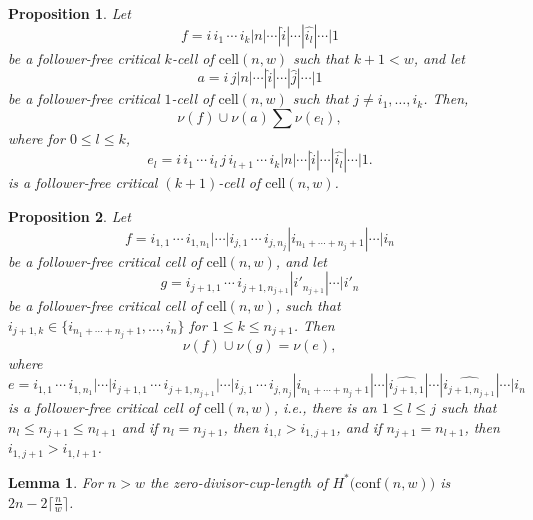 \documentclass[10pt,a4paper]{amsart}
\newtheorem{prop}{Proposition}
\newtheorem{lem}{Lemma}
\begin{document}
\begin{prop}\label{product of critical cells with same first element is a sum of critical cells with the same first element}
Let
\[
f=i\, i_{1}\, \cdots\, i_{k}|n|\cdots|\widehat{i}|\cdots|\widehat{i_{l}}|\cdots|1
\]
be a follower-free critical $k$-cell of $\text{cell}(n,w)$ such that $k+1<w$, and let
\[
a=i\, j|n|\cdots|\widehat{i}|\cdots|\widehat{j}|\cdots|1
\]
be a follower-free critical $1$-cell of $\text{cell}(n,w)$ such that $j\neq i_{1},\dots, i_{k}$.
Then,
\[
\nu(f)\cup\nu(a)\sum\nu(e_{l}),
\]
where for $0\le l\le k$,
\[
e_{l}=i\, i_{1}\, \cdots\,i_{l}\, j\, i_{l+1}\, \cdots\,  i_{k}|n|\cdots|\widehat{i}|\cdots|\widehat{i_{l}}|\cdots|1.
\]
is a follower-free critical $(k+1)$-cell of $\text{cell}(n,w)$.
\end{prop}

\begin{prop}\label{product of disjoint critical cells}
Let
\[
f=i_{1,1}\, \cdots\, i_{1, n_{1}}|\cdots|i_{j, 1}\, \cdots\, i_{j, n_{j}}|i_{n_{1}+\cdots+n_{j}+1}|\cdots|i_{n}
\]
be a follower-free critical cell of $\text{cell}(n,w)$,
and let
\[
g=i_{j+1, 1}\, \cdots\, i_{j+1, n_{j+1}}|i'_{n_{j+1}}|\cdots|i'_{n}
\]
be a follower-free critical cell of $\text{cell}(n,w)$, such that $i_{j+1, k}\in \{i_{n_{1}+\cdots+n_{j}+1},\dots,i_{n}\}$ for $1\le k\le n_{j+1}$.
Then
\[
\nu(f)\cup \nu(g)=\nu(e),
\]
where
\[
e=i_{1,1}\, \cdots\, i_{1, n_{1}}|\cdots|i_{j+1, 1}\, \cdots\, i_{j+1, n_{j+1}}|\cdots|i_{j, 1}\, \cdots\, i_{j, n_{j}}|i_{n_{1}+\cdots+n_{j}+1}|\cdots|\widehat{i_{j+1, 1}}|\cdots|\widehat{i_{j+1, n_{j+1}}}|\cdots|i_{n}
\]
is a follower-free critical cell of $\text{cell}(n,w)$, i.e., there is an $1\le l\le j$ such that $n_{l}\le n_{j+1}\le n_{l+1}$ and if $n_{l}=n_{j+1}$, then $i_{1, l}>i_{1,j+1}$, and if $n_{j+1}=n_{l+1}$, then $i_{1, j+1}>i_{1,l+1}$.
\end{prop}

\begin{lem}\label{cup divisor cup length for all w}
For $n>w$ the zero-divisor-cup-length of $H^{*}\big(\text{conf}(n,w)\big)$ is $2n-2\big\lceil\frac{n}{w}\big\rceil$.
\end{lem}
\end{document}
